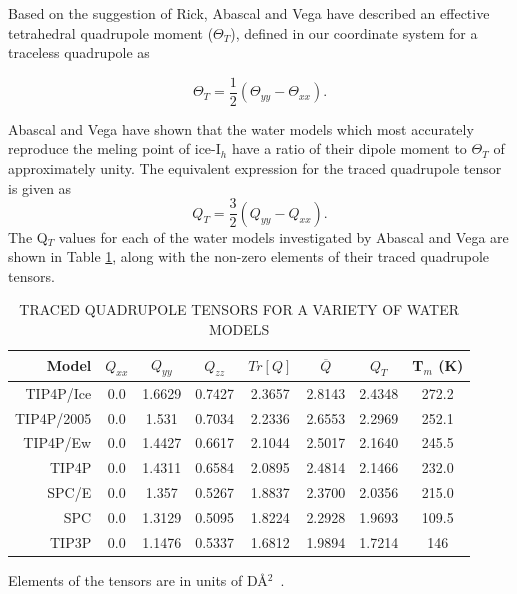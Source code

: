 Based on the suggestion of Rick\cite{Rick2004}, Abascal and Vega have
described an effective tetrahedral quadrupole moment ($\Theta_T$),
defined in our coordinate system for a traceless quadrupole as

\begin{equation}
\Theta_{T} = \frac{1}{2}(\Theta_{yy} - \Theta_{xx}).
\end{equation} 

Abascal and Vega have shown that the water models which most accurately
reproduce the meling point of ice-I$_h$ have a ratio of their dipole moment
to $\Theta_T$ of approximately unity. The equivalent expression for the 
traced quadrupole tensor is given as
\begin{equation}
Q_{T} = \frac{3}{2}(Q_{yy} - Q_{xx}).
\end{equation}
The Q$_T$ values for each of the water models
investigated by Abascal and Vega are shown in Table \ref{Models_quad}, along 
with the non-zero elements of their traced quadrupole tensors.

\begin{table}[h!]
\caption{TRACED QUADRUPOLE TENSORS FOR A VARIETY OF WATER MODELS}
\label{Models_quad}
\begin{tabular}{rccccccc}
\hline\hline
Model & $Q_{xx}$ & $Q_{yy}$ & $Q_{zz}$ & $Tr[Q]$ & $\overline{Q}$ & $Q_{T}$ &
                                                                    T$_{m}$ (K) \\
\hline 
TIP4P/Ice & 0.0 & 1.6629 & 0.7427 & 2.3657 & 2.8143 & 2.4348  & 272.2 \\
TIP4P/2005 & 0.0 & 1.531 & 0.7034 & 2.2336 & 2.6553 & 2.2969  & 252.1 \\
TIP4P/Ew & 0.0 & 1.4427 & 0.6617 & 2.1044  & 2.5017 & 2.1640  & 245.5   \\
TIP4P & 0.0 & 1.4311 & 0.6584 & 2.0895 & 2.4814 & 2.1466 & 232.0 \\
SPC/E & 0.0 & 1.357 & 0.5267 & 1.8837 & 2.3700 & 2.0356 & 215.0 \\
SPC & 0.0 & 1.3129 & 0.5095 & 1.8224 & 2.2928 & 1.9693 & 109.5 \\
TIP3P & 0.0 & 1.1476 & 0.5337 & 1.6812 & 1.9894 & 1.7214 & 146 \\
\hline \hline
\end{tabular}
\begin{flushleft}
Elements of the tensors are in units of D\AA$^{2}$~. \\
\end{flushleft}
\end{table} 

